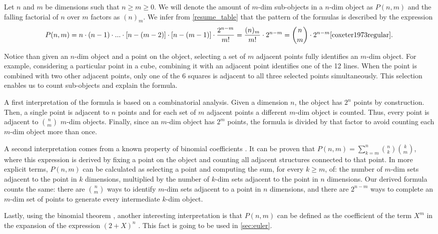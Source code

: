 \documentclass{article}
\begin{document}
	Let $n$ and $m$ be dimensions such that $n \geq m \geq 0$. We will denote the amount of $m$-dim sub-objects in a $n$-dim object as $P(n,m)$ and the falling factorial of $n$ over $m$ factors as $(n)_{m}$. We infer from \autoref{resume_table} that the pattern of the formulas is described by the expression
	$$P(n,m) = n \cdot (n-1)\cdot ... \cdot [n-(m-2)] \cdot [n-(m-1)] \cdot \frac{2^{n-m}}{m!} = \frac{(n)_{m}}{m!} \cdot 2^{n-m} = \binom{n}{m}\cdot2^{n-m} \cite{coxeter1973regular}.$$
	
	Notice than given an $n$-dim object and a point on the object, selecting a set of $m$ adjacent points fully identifies an $m$-dim object. For example, considering a particular point in a cube, combining it with an adjacent point identifies one of the 12 lines. When the point is combined with two other adjacent points, only one of the 6 squares is adjacent to all three selected points simultaneously. This selection enables us to count sub-objects and explain the formula.
	
	A first interpretation of the formula is based on a combinatorial analysis. Given a dimension $n$, the object has $2^{n}$ points by construction. Then, a single point is adjacent to $n$ points and for each set of $m$ adjacent points a different $m$-dim object is counted. Thus, every point is adjacent to $\binom{n}{m}$ $m$-dim objects. Finally, since an $m$-dim object has $2^{m}$ points, the formula is divided by that factor to avoid counting each $m$-dim object more than once.
	
	A second interpretation comes from a known property of binomial coefficients \cite{rice2007}. It can be proven that $P(n,m) = \sum_{k=m}^{n} \binom{n}{k} \binom{k}{m}$, where this expression is derived by fixing a point on the object and counting all adjacent structures connected to that point. In more explicit terms, $P(n,m)$ can be calculated as selecting a point and computing the sum, for every $k\geq m$, of: the number of $m$-dim sets adjacent to the point in $k$ dimensions, multiplied by the number of $k$-dim sets adjacent to the point in $n$ dimensions. Our derived formula counts the same: there are $\binom{n}{m}$ ways to identify $m$-dim sets adjacent to a point in $n$ dimensions, and there are $2^{n-m}$ ways to complete an $m$-dim set of points to generate every intermediate $k$-dim object.
	
	Lastly, using the binomial theorem \cite{rice2007}, another interesting interpretation is that $P(n,m)$ can be defined as the coefficient of the term $X^{m}$ in the expansion of the expression $(2 + X)^{n}$ \cite{coxeter1973regular}. This fact is going to be used in \autoref{sec:euler}.
	
\end{document}

